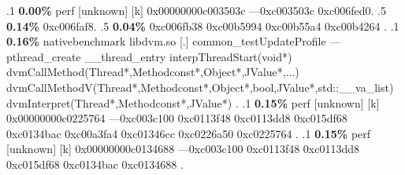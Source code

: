 \begin{profile}
{.1 \textbf{ 0.00\%} perf             [unknown]              [k] 0x00000000c003503c\newline {} ---0xc003503c\newline {} 0xc006fed0. 
.5 \textbf{0.14\%} 0xc006faf8. 
.5 \textbf{0.04\%} 0xc006fb38\newline {} 0xc00b5994\newline {} 0xc00b55a4\newline {} 0xc00b4264\newline {} . 
.1 \textbf{ 0.16\%} nativebenchmark  libdvm.so              [.] common\_testUpdateProfile\newline {} ---pthread\_create\newline {} \_\_thread\_entry\newline {} interpThreadStart(void*)\newline {} dvmCallMethod(Thread*,Methodconst*,Object*,JValue*,...)\newline {} dvmCallMethodV(Thread*,Methodconst*,Object*,bool,JValue*,std::\_\_va\_list)\newline {} dvmInterpret(Thread*,Methodconst*,JValue*)\newline {} . 
.1 \textbf{ 0.15\%} perf             [unknown]              [k] 0x00000000c0225764\newline {} ---0xc003c100\newline {} 0xc0113f48\newline {} 0xc0113dd8\newline {} 0xc015df68\newline {} 0xc0134bac\newline {} 0xc00a3fa4\newline {} 0xc01346cc\newline {} 0xc0226a50\newline {} 0xc0225764\newline {} . 
.1 \textbf{ 0.15\%} perf             [unknown]              [k] 0x00000000c0134688\newline {} ---0xc003c100\newline {} 0xc0113f48\newline {} 0xc0113dd8\newline {} 0xc015df68\newline {} 0xc0134bac\newline {} 0xc0134688\newline {} . 
}
\end{profile}
